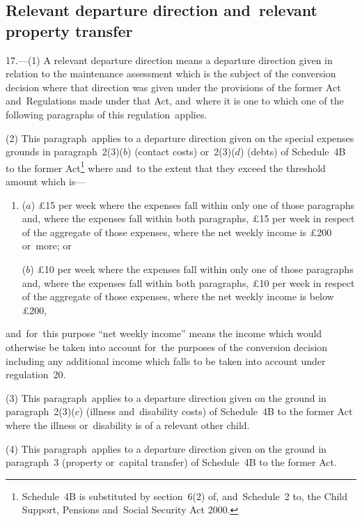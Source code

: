 \documentclass[12pt,a4paper]{article}
\begin{document}
\vfill

\subsection[17. Relevant departure 
direction  %
and~relevant property transfer]{\sloppy Relevant departure 
direction  %
and~relevant property transfer}

17.---(1)  A relevant departure direction means a departure direction given in relation to the maintenance assessment which is the subject of the conversion decision where that direction was given under the provisions of the former Act and~Regulations made under that Act, and~where it is one to which one of the following paragraphs of this regulation~applies.

(2) This paragraph~applies to a departure direction given on the special expenses grounds in paragraph~2(3)($b$)  (contact costs) or~2(3)($d$)  (debts) of Schedule~4B to the former Act\footnote{\frenchspacing Schedule~4B is substituted by section~6(2) of, and~Schedule~2 to, the Child Support, Pensions and~Social Security Act 2000.} where and~to the extent that they exceed the threshold amount which is—
\begin{enumerate}\item[]
($a$) £15 per week where the expenses fall within only one of those paragraphs and, where the expenses fall within both paragraphs, £15 per week in respect of the aggregate of those expenses, where the net weekly income is £200 or~more; or

($b$) £10 per week where the expenses fall within only one of those paragraphs and, where the expenses fall within both paragraphs, £10 per week in respect of the aggregate of those expenses, where the net weekly income is below £200,
\end{enumerate}
and~for~this purpose “net weekly income” means the income which would otherwise be taken into account for~the purposes of the conversion decision including any additional income which falls to be taken into account under regulation~20.

(3) This paragraph~applies to a departure direction given on the ground in paragraph~2(3)($c$)  (illness and~disability costs) of Schedule~4B to the former Act where the illness or~disability is of a relevant other child.

(4) This paragraph~applies to a departure direction given on the ground in paragraph~3 (property or~capital transfer) of Schedule~4B to the former Act.
\end{document}
